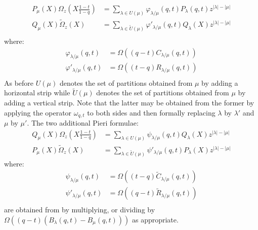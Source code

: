 \documentclass[12pt,dvips]{amsart}
\begin{document}
\begin{align*}
P_\mu(X)  \Omega_z \left(X \frac{1-t}{1-q}\right) & =  \sum_{\lambda \in U(\mu)} \varphi_{\lambda / \mu}(q,t) P_\lambda(q,t) z^{|\lambda| - |\mu|} \\
Q_\mu(X) \tilde{\Omega}_z(X) & = \sum_{\lambda \in \tilde{U}(\mu)} \varphi'_{\lambda / \mu}(q,t) Q_\lambda(X) z^{|\lambda| - |\mu|} \\
\end{align*}
where:
\begin{align*}
\varphi_{\lambda / \mu}(q,t) & = \Omega ( (q - t) C_{\lambda / \mu}(q,t)) \\
\varphi'_{\lambda / \mu}(q,t) & = \Omega ( (t - q) R_{\lambda / \mu}(q,t) ) \\
\end{align*}
As before $U(\mu)$ denotes the set of partitions obtained from $\mu$ by adding a horizontal strip while $\tilde{U}(\mu)$ denotes the set of partitions obtained from $\mu$ by adding a vertical strip. 
Note that the latter may be obtained from the former by applying the operator $\omega_{q,t}$ to both sides and then formally replacing $\lambda$ by $\lambda'$ and $\mu$ by $\mu'$. %
The two additional Pieri formulae:
\begin{align*}
Q_\mu(X) \Omega_z \left(X \frac{1-t}{1-q}\right) & =  \sum_{\lambda \in U(\mu)} \psi_{\lambda / \mu}(q,t) Q_\lambda(X)z^{|\lambda| - |\mu|} \\
P_\mu(X) \tilde{\Omega}_z(X) & = \sum_{\lambda \in \tilde{U}(\mu)}\psi'_{\lambda / \mu}(q,t) P_\lambda(X) z^{|\lambda| - |\mu|}
\end{align*}
where:
\begin{align*}
\psi_{\lambda / \mu}(q,t) & =  \Omega((t - q) \tilde{C}_{\lambda / \mu}(q,t)) \\
\psi'_{\lambda / \mu}(q,t) & =  \Omega((q - t) \tilde{R}_{\lambda / \mu}(q,t)) \\
\end{align*}
are obtained from by multiplying, or dividing by $\Omega((q-t)(B_\lambda(q,t) - B_\mu(q,t)))$ as appropriate.
\end{document}
